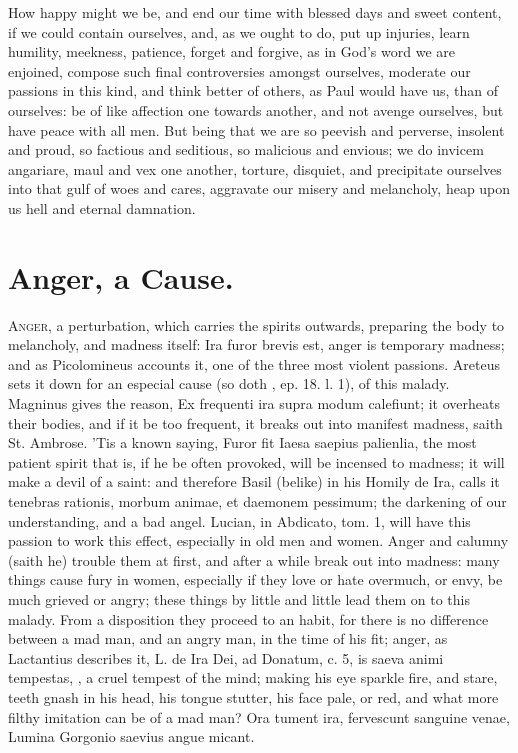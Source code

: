 {How happy might we be, and end our time with blessed days and sweet
content, if we could contain ourselves, and, as we ought to do, put up
injuries, learn humility, meekness, patience, forget and forgive, as in
God's word we are enjoined, compose such final controversies
amongst ourselves, moderate our passions in this kind, and think better
of others, as Paul would have us, than of ourselves: be of like
affection one towards another, and not avenge ourselves, but have peace
with all men. But being that we are so peevish and perverse, insolent
and proud, so factious and seditious, so malicious and envious; we do
invicem angariare, maul and vex one another, torture, disquiet, and
precipitate ourselves into that gulf of woes and cares, aggravate our
misery and melancholy, heap upon us hell and eternal damnation.

\section{Anger, a Cause.}

\lettrine{A}{nger}, a perturbation, which carries the spirits outwards, preparing
the body to melancholy, and madness itself: Ira furor brevis est, anger
is temporary madness; and as Picolomineus accounts it, one of the
three most violent passions. Areteus sets it down for an especial
cause (so doth \Seneca, ep. 18. l. 1), of this malady. Magninus
gives the reason, Ex frequenti ira supra modum calefiunt; it overheats
their bodies, and if it be too frequent, it breaks out into manifest
madness, saith St. Ambrose. 'Tis a known saying, Furor fit Iaesa
saepius palienlia, the most patient spirit that is, if he be often
provoked, will be incensed to madness; it will make a devil of a saint:
and therefore Basil (belike) in his Homily de Ira, calls it tenebras
rationis, morbum animae, et daemonem pessimum; the darkening of our
understanding, and a bad angel. Lucian, in Abdicato, tom. 1, will
have this passion to work this effect, especially in old men and women.
Anger and calumny (saith he) trouble them at first, and after a while
break out into madness: many things cause fury in women, especially if
they love or hate overmuch, or envy, be much grieved or angry; these
things by little and little lead them on to this malady. From a
disposition they proceed to an habit, for there is no difference
between a mad man, and an angry man, in the time of his fit; anger, as
Lactantius describes it, L. de Ira Dei, ad Donatum, c. 5, is
saeva animi tempestas, \etc{}, a cruel tempest of the mind; making
his eye sparkle fire, and stare, teeth gnash in his head, his tongue
stutter, his face pale, or red, and what more filthy imitation can be
of a mad man?
Ora tument ira, fervescunt sanguine venae,
Lumina Gorgonio saevius angue micant.

}
